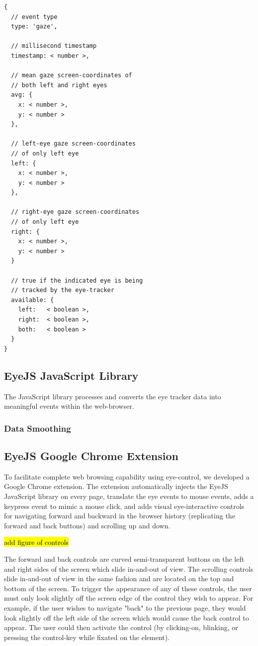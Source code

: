 \documentclass{sigchi}
\begin{document}
\begin{lstlisting}
{
  // event type
  type: 'gaze',

  // millisecond timestamp
  timestamp: < number >,

  // mean gaze screen-coordinates of
  // both left and right eyes
  avg: {
    x: < number >,
    y: < number >
  },

  // left-eye gaze screen-coordinates
  // of only left eye
  left: {
    x: < number >,
    y: < number >
  },

  // right-eye gaze screen-coordinates
  // of only left eye
  right: {
    x: < number >,
    y: < number >
  }

  // true if the indicated eye is being
  // tracked by the eye-tracker
  available: {
    left:   < boolean >,
    right:  < boolean >,
    both:   < boolean >
  }
}
\end{lstlisting}


\subsection{EyeJS JavaScript Library}
The JavaScript library processes and converts the eye tracker data
into meaningful events within the web-browser.

\subsubsection{Data Smoothing}

\subsubsection{}


\subsection{EyeJS Google Chrome Extension}
To facilitate complete web browsing capability using eye-control, we 
developed a Google Chrome extension. The extension automatically injects
the EyeJS JavaScript library on every page, translate the eye events to 
mouse events, adds a keypress event to mimic a mouse click, and adds 
visual eye-interactive controls for navigating forward and backward in
the browser history (replicating the forward and back buttons) and 
scrolling up and down.

\hl{add figure of controls}

The forward and back controls are curved semi-transparent buttons on 
the left and right sides of the screen which slide in-and-out of view.
The scrolling controls slide in-and-out of view in the same fashion and
are located on the top and bottom of the screen. To trigger the 
appearance of any of these controls, the user must only look slightly 
off the screen edge of the control they wish to appear. For example, 
if the user wishes to navigate "back" to the previous page, they would
look slightly off the left side of the screen which would cause the 
back control to appear. The user could then activate the control (by
clicking-on, blinking, or pressing the control-key while fixated 
on the element).
\end{document}
